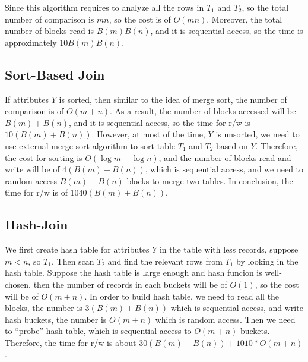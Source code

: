 \documentclass{article}
\begin{document}
Since this algorithm requires to analyze all the rows in $T_{1}$ and $T_{2}$, so the total number of comparison is $mn$, so the cost is of $O(mn)$. Moreover, the total number of blocks read is $B(m)B(n)$, and it is sequential access, so the time is approximately $10B(m)B(n)$.

\goodbreak

\subsection{Sort-Based Join}

If attributes $Y$ is sorted, then similar to the idea of merge sort, the number of comparison is of $O(m+n)$. As a result, the number of blocks accessed will be $B(m)+B(n)$, and it is sequential access, so the time for r/w is $10(B(m)+B(n))$. However, at most of the time, $Y$ is unsorted, we need to use external merge sort algorithm to sort table $T_{1}$ and $T_{2}$ based on $Y$. Therefore, the cost for sorting is $O(\log{m}+\log{n})$, and the number of blocks read and write will be of $4(B(m)+B(n))$, which is sequential access, and we need to random access $B(m)+B(n)$ blocks to merge two tables. In conclusion, the time for r/w is of $1040(B(m)+B(n))$.

\goodbreak

\subsection{Hash-Join}

We first create hash table for attributes $Y$ in the table with less records, suppose $m<n$, so $T_{1}$. Then scan $T_{2}$ and find the relevant rows from $T_{1}$ by looking in the hash table. Suppose the hash table is large enough and hash funcion is well-chosen, then the number of records in each buckets will be of $O(1)$, so the cost will be of $O(m+n)$. In order to build hash table, we need to read all the blocks, the number is $3(B(m)+B(n))$ which is sequential access, and write hash buckets, the number is $O(m+n)$ which is random access. Then we need to ``probe'' hash table, which is sequential access to $O(m+n)$ buckets. Therefore, the time for r/w is about $30(B(m)+B(n))+1010*O(m+n)$.
\end{document}
